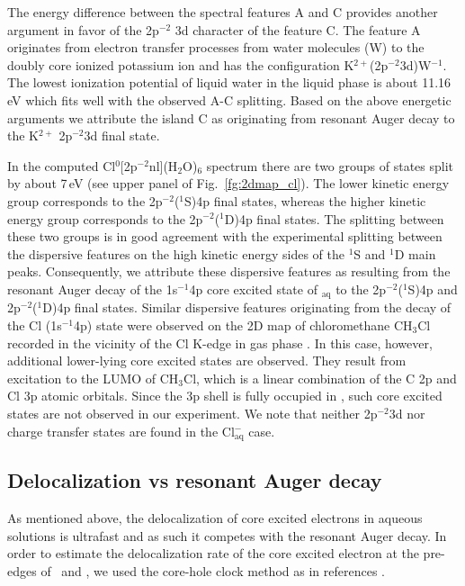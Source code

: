 The energy difference between the spectral features A and C provides another argument in favor of the 2p$^{-2}$ 3d character of the feature C. The feature A originates from electron transfer processes from water molecules (W) to the doubly core ionized potassium ion and has the configuration K$^{2+}$(2p$^{-2}$3d)W$^{-1}$. The lowest ionization potential of liquid water in the liquid phase is about 11.16\,eV \cite{winter04:2625} which fits well with the observed A-C splitting. Based on the above energetic arguments we attribute the island C as originating from resonant Auger decay to the K$^{2+}$ 2p$^{-2}$3d final state.


In the computed Cl$^{0}$[2p$^{-2}$nl](H$_2$O)$_6$ spectrum there are two groups of states split by about 7\,eV (see upper panel of Fig.\ \ref{fg:2dmap_cl}). The lower kinetic energy group corresponds to the 2p$^{-2}$($^1$S)4p final states, whereas the higher kinetic energy group corresponds to the 2p$^{-2}$($^1$D)4p final states. The splitting between these two groups is in good agreement with the experimental splitting between the dispersive features on the high kinetic energy sides of the $^1$S and $^1$D main peaks. Consequently, we attribute these dispersive features as resulting from the resonant Auger decay of the 1s$^{-1}$4p core excited state of \cli$_{\text{aq}}$ to the 2p$^{-2}$($^1$S)4p and  2p$^{-2}$($^1$D)4p final states. Similar dispersive features originating from the decay of the Cl (1s$^{-1}$4p) state were observed on the 2D map of chloromethane CH$_3$Cl recorded in the vicinity of the Cl K-edge in gas phase \cite{gold16:133001}. In this case, however, additional lower-lying core excited states are observed. They result from excitation to the LUMO of CH$_3$Cl, which is a linear combination of the C 2p and Cl 3p atomic orbitals. Since the 3p shell is fully occupied in \cli, such core excited states are not observed in our experiment. We note that neither 2p$^{-2}$3d nor charge transfer states are found in the Cl$^{-}_{\text{aq}}$ case.


\subsection{Delocalization vs resonant Auger decay}

As mentioned above, the delocalization of core excited electrons in aqueous solutions is ultrafast and as such it competes with the resonant Auger decay. In order to estimate the delocalization rate of the core excited electron at the pre-edges of \ki~and \cli, we used the core-hole clock method as in references \cite{bjorneholm92:1892,karis96:1380}.

